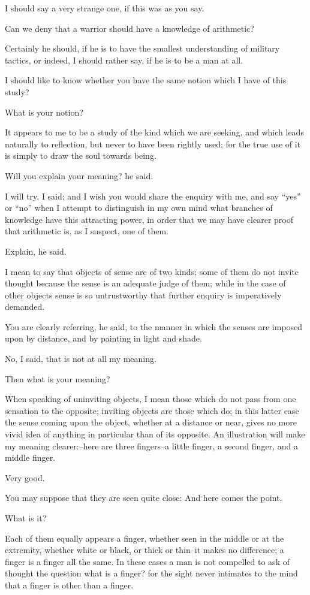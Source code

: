 I should say a very strange one, if this was as you say.

Can we deny that a warrior should have a knowledge of arithmetic?

Certainly he should, if he is to have the smallest understanding of
military tactics, or indeed, I should rather say, if he is to be a man
at all.

I should like to know whether you have the same notion which I have of
this study?

What is your notion?

It appears to me to be a study of the kind which we are seeking, and
which leads naturally to reflection, but never to have been rightly
used; for the true use of it is simply to draw the soul towards being.

Will you explain your meaning? he said.

I will try, I said; and I wish you would share the enquiry with me,
and say ``yes'' or ``no'' when I attempt to distinguish in my own mind what
branches of knowledge have this attracting power, in order that we may
have clearer proof that arithmetic is, as I suspect, one of them.

Explain, he said.

I mean to say that objects of sense are of two kinds; some of them do
not invite thought because the sense is an adequate judge of them; while
in the case of other objects sense is so untrustworthy that further
enquiry is imperatively demanded.

You are clearly referring, he said, to the manner in which the senses
are imposed upon by distance, and by painting in light and shade.

No, I said, that is not at all my meaning.

Then what is your meaning?

When speaking of uninviting objects, I mean those which do not pass from
one sensation to the opposite; inviting objects are those which do; in
this latter case the sense coming upon the object, whether at a distance
or near, gives no more vivid idea of anything in particular than of its
opposite. An illustration will make my meaning clearer:--here are three
fingers--a little finger, a second finger, and a middle finger.

Very good.

You may suppose that they are seen quite close: And here comes the
point.

What is it?

Each of them equally appears a finger, whether seen in the middle or
at the extremity, whether white or black, or thick or thin--it makes no
difference; a finger is a finger all the same. In these cases a man is
not compelled to ask of thought the question what is a finger? for the
sight never intimates to the mind that a finger is other than a finger.

